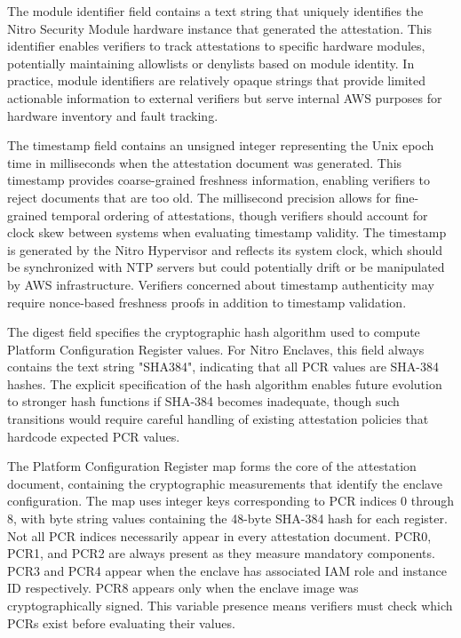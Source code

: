 The module identifier field contains a text string that uniquely identifies the Nitro Security Module hardware instance that generated the attestation. This identifier enables verifiers to track attestations to specific hardware modules, potentially maintaining allowlists or denylists based on module identity. In practice, module identifiers are relatively opaque strings that provide limited actionable information to external verifiers but serve internal AWS purposes for hardware inventory and fault tracking.

The timestamp field contains an unsigned integer representing the Unix epoch time in milliseconds when the attestation document was generated. This timestamp provides coarse-grained freshness information, enabling verifiers to reject documents that are too old. The millisecond precision allows for fine-grained temporal ordering of attestations, though verifiers should account for clock skew between systems when evaluating timestamp validity. The timestamp is generated by the Nitro Hypervisor and reflects its system clock, which should be synchronized with NTP servers but could potentially drift or be manipulated by AWS infrastructure. Verifiers concerned about timestamp authenticity may require nonce-based freshness proofs in addition to timestamp validation.

The digest field specifies the cryptographic hash algorithm used to compute Platform Configuration Register values. For Nitro Enclaves, this field always contains the text string "SHA384", indicating that all PCR values are SHA-384 hashes. The explicit specification of the hash algorithm enables future evolution to stronger hash functions if SHA-384 becomes inadequate, though such transitions would require careful handling of existing attestation policies that hardcode expected PCR values.

The Platform Configuration Register map forms the core of the attestation document, containing the cryptographic measurements that identify the enclave configuration. The map uses integer keys corresponding to PCR indices 0 through 8, with byte string values containing the 48-byte SHA-384 hash for each register. Not all PCR indices necessarily appear in every attestation document. PCR0, PCR1, and PCR2 are always present as they measure mandatory components. PCR3 and PCR4 appear when the enclave has associated IAM role and instance ID respectively. PCR8 appears only when the enclave image was cryptographically signed. This variable presence means verifiers must check which PCRs exist before evaluating their values.

